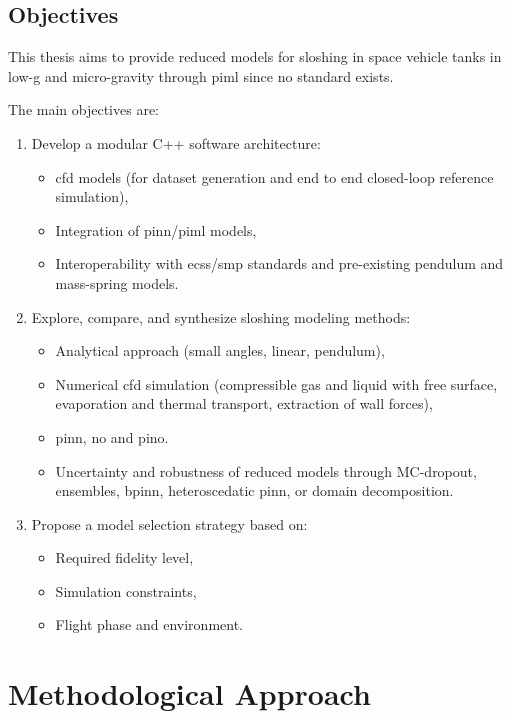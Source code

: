 \documentclass[12pt]{article}
\begin{document}
	\subsection*{Objectives}
	
	This thesis aims to provide reduced models for sloshing in space vehicle tanks in low-g and micro-gravity through \acrshort{piml} since no standard exists.
	
	The main objectives are:
	\begin{enumerate}
		\item Develop a modular C++ software architecture:
		\begin{itemize}
			\item \acrshort{cfd} models (for dataset generation and end to end closed-loop reference simulation),
			\item Integration of \acrshort{pinn}/\acrshort{piml} models,
			\item Interoperability with \acrshort{ecss}/\acrshort{smp} standards and pre-existing pendulum and mass-spring models.
		\end{itemize}
		\item Explore, compare, and synthesize sloshing modeling methods:
		\begin{itemize}
			\item Analytical approach (small angles, linear, pendulum),
			\item Numerical \acrshort{cfd} simulation (compressible gas and liquid with free surface, evaporation and thermal transport, extraction of wall forces),
			\item \acrfull{pinn}, \acrfull{no} and \acrfull{pino}.
			
			\item Uncertainty and robustness of reduced models through MC-dropout, ensembles,  \acrshort{bpinn}, heteroscedatic \acrshort{pinn}, or domain decomposition.
		\end{itemize}
		\item Propose a model selection strategy based on:
		\begin{itemize}
			\item Required fidelity level,
			\item Simulation constraints,
			\item Flight phase and environment.
		\end{itemize}
	\end{enumerate}
	
	\section*{Methodological Approach}
	
\end{document}
